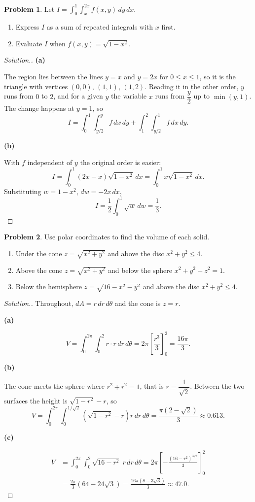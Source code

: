 \documentclass[11pt,a4paper]{article}
\theoremstyle{definition}
\newtheorem{problemx}{Problem}[subsection]
\newenvironment{problem}{\begin{problemx}}{\end{problemx}}
\newenvironment{solution}
  {\renewcommand{\qedsymbol}{}\begin{proof}[\textit{Solution}.]}
  {\end{proof}}
\newcommand{\subhead}[1]{%
  \par\medskip\noindent\textbf{#1}\par\nobreak\smallskip}
\begin{document}
\begin{problem}
Let $\displaystyle{I = \int_0^1\int_x^{2x}f(x,y)\,dy\,dx}$.
\begin{enumerate}
\item[(a)] Express $I$ as a sum of repeated integrals with $x$ first.
\item[(b)] Evaluate $I$ when $f(x,y) = \sqrt{1-x^2}$.
\end{enumerate}
\end{problem}
\begin{solution}
\subhead{(a)}
The region lies between the lines $y=x$ and $y=2x$ for $0\leq x\leq 1$, so it is
the triangle with vertices $(0,0)$, $(1,1)$, $(1,2)$. Reading it in the other
order, $y$ runs from $0$ to $2$, and for a given $y$ the variable $x$ runs from
$\dfrac{y}{2}$ up to $\min(y,1)$. The change happens at $y=1$, so
\[I = \int_0^1\int_{y/2}^{y}f\,dx\,dy + \int_1^2\int_{y/2}^{1}f\,dx\,dy .\]

\subhead{(b)}
With $f$ independent of $y$ the original order is easier:
\[I = \int_0^1(2x-x)\sqrt{1-x^2}\,dx = \int_0^1x\sqrt{1-x^2}\,dx .\]
Substituting $w = 1-x^2$, $dw = -2x\,dx$,
\[I = \frac12\int_0^1\sqrt w\,dw = \frac13 .\]
\end{solution}

\begin{problem}
Use polar coordinates to find the volume of each solid.
\begin{enumerate}
\item[(a)] Under the cone $z = \sqrt{x^2+y^2}$ and above the disc
$x^2+y^2\leq 4$.
\item[(b)] Above the cone $z = \sqrt{x^2+y^2}$ and below the sphere
$x^2+y^2+z^2 = 1$.
\item[(c)] Below the hemisphere $z = \sqrt{16-x^2-y^2}$ and above the disc
$x^2+y^2\leq 4$.
\end{enumerate}
\end{problem}
\begin{solution}
Throughout, $dA = r\,dr\,d\theta$ and the cone is $z = r$.

\subhead{(a)}
\[V = \int_0^{2\pi}\int_0^2 r\cdot r\,dr\,d\theta
= 2\pi\left[\frac{r^3}{3}\right]_0^2 = \frac{16\pi}{3}.\]

\subhead{(b)}
The cone meets the sphere where $r^2+r^2 = 1$, that is
$r = \dfrac{1}{\sqrt2}$. Between the two surfaces the height is
$\sqrt{1-r^2}-r$, so
\[V = \int_0^{2\pi}\int_0^{1/\sqrt2}(\sqrt{1-r^2}-r)r\,dr\,d\theta
= \frac{\pi(2-\sqrt2)}{3}\approx 0.613 .\]

\subhead{(c)}
\begin{align*}
V & = \int_0^{2\pi}\int_0^2\sqrt{16-r^2}\;r\,dr\,d\theta
= 2\pi\left[-\frac{(16-r^2)^{3/2}}{3}\right]_0^2\\
& = \frac{2\pi}{3}(64-24\sqrt3) = \frac{16\pi(8-3\sqrt3)}{3}\approx 47.0 .
\end{align*}
\end{solution}
\end{document}
